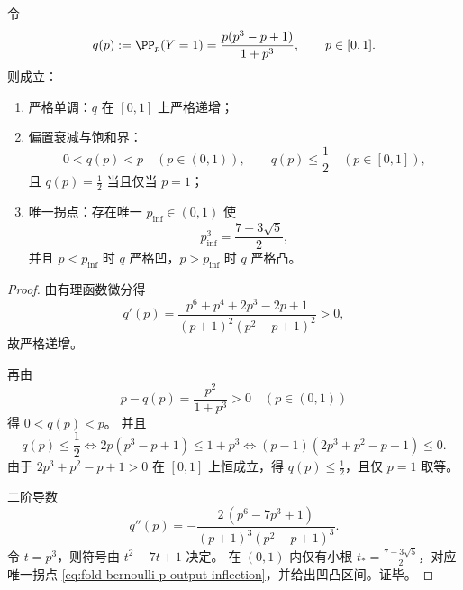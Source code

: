 \begin{theorem}\label{thm:fold-bernoulli-p-output-density-concavity-switch}
令
\[
q(p):=\PP_p(Y=1)=\frac{p(p^3-p+1)}{1+p^3},\qquad p\in[0,1].
\]
则成立：
\begin{enumerate}
  \item 严格单调：\(q\) 在 \([0,1]\) 上严格递增；
  \item 偏置衰减与饱和界：
  \[
  0<q(p)<p\quad(p\in(0,1)),\qquad
  q(p)\le \frac12\quad(p\in[0,1]),
  \]
  且 \(q(p)=\tfrac12\) 当且仅当 \(p=1\)；
  \item 唯一拐点：存在唯一 \(p_{\mathrm{inf}}\in(0,1)\) 使
  \begin{equation}\label{eq:fold-bernoulli-p-output-inflection}
  p_{\mathrm{inf}}^3=\frac{7-3\sqrt5}{2},
  \end{equation}
  并且 \(p<p_{\mathrm{inf}}\) 时 \(q\) 严格凹，\(p>p_{\mathrm{inf}}\) 时 \(q\) 严格凸。
\end{enumerate}
\end{theorem}
\begin{proof}
由有理函数微分得
\[
q'(p)=\frac{p^6+p^4+2p^3-2p+1}{(p+1)^2(p^2-p+1)^2}>0,
\]
故严格递增。

再由
\[
p-q(p)=\frac{p^2}{1+p^3}>0\quad(p\in(0,1))
\]
得 \(0<q(p)<p\)。
并且
\[
q(p)\le \frac12
\iff
2p(p^3-p+1)\le 1+p^3
\iff
(p-1)(2p^3+p^2-p+1)\le 0.
\]
由于 \(2p^3+p^2-p+1>0\) 在 \([0,1]\) 上恒成立，得 \(q(p)\le \tfrac12\)，且仅 \(p=1\) 取等。

二阶导数
\[
q''(p)=
-\frac{2\,(p^6-7p^3+1)}{(p+1)^3(p^2-p+1)^3}.
\]
令 \(t=p^3\)，则符号由 \(t^2-7t+1\) 决定。
在 \((0,1)\) 内仅有小根
\(
t_\ast=\frac{7-3\sqrt5}{2}
\)，对应唯一拐点
\eqref{eq:fold-bernoulli-p-output-inflection}，并给出凹凸区间。证毕。
\end{proof}


\endinput

